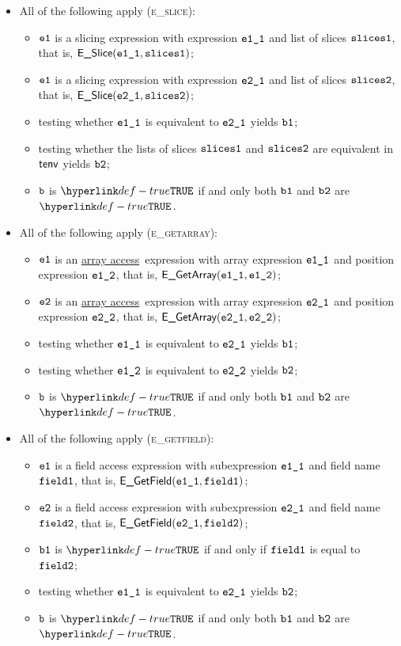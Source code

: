 \documentclass{book}
\newcommand\ProseOrTypeError[0]{\ProseTerminateAs{\TypeErrorConfig}}
\newcommand\arrayaccess[0]{\hyperlink{def-arrayaccess}{array access}}
\begin{document}
\begin{itemize}
  \item All of the following apply (\textsc{e\_slice}):
  \begin{itemize}
    \item $\texttt{e1}$ is a slicing expression with expression $\texttt{e1\_1}$ and list of slices $\texttt{slices1}$,
          that is, $\textsf{E\_Slice}(\texttt{e1\_1}, \texttt{slices1})$;
    \item $\texttt{e1}$ is a slicing expression with expression $\texttt{e2\_1}$ and list of slices $\texttt{slices2}$,
          that is, $\textsf{E\_Slice}(\texttt{e2\_1}, \texttt{slices2})$;
    \item testing whether $\texttt{e1\_1}$ is equivalent to $\texttt{e2\_1}$ yields $\texttt{b1}$\ProseOrTypeError;
    \item testing whether the lists of slices $\texttt{slices1}$ and $\texttt{slices2}$ are equivalent in $\textsf{tenv}$ yields $\texttt{b2}$\ProseOrTypeError;
    \item $\texttt{b}$ is $\True$ if and only both $\texttt{b1}$ and $\texttt{b2}$ are $\True$.
  \end{itemize}

  \item All of the following apply (\textsc{e\_getarray}):
  \begin{itemize}
    \item $\texttt{e1}$ is an \arrayaccess\ expression with array expression $\texttt{e1\_1}$ and position expression $\texttt{e1\_2}$,
          that is, $\textsf{E\_GetArray}(\texttt{e1\_1}, \texttt{e1\_2})$;
    \item $\texttt{e2}$ is an \arrayaccess\ expression with array expression $\texttt{e2\_1}$ and position expression $\texttt{e2\_2}$,
          that is, $\textsf{E\_GetArray}(\texttt{e2\_1}, \texttt{e2\_2})$;
    \item testing whether $\texttt{e1\_1}$ is equivalent to $\texttt{e2\_1}$ yields $\texttt{b1}$\ProseOrTypeError;
    \item testing whether $\texttt{e1\_2}$ is equivalent to $\texttt{e2\_2}$ yields $\texttt{b2}$\ProseOrTypeError;
    \item $\texttt{b}$ is $\True$ if and only both $\texttt{b1}$ and $\texttt{b2}$ are $\True$.
  \end{itemize}

  \item All of the following apply (\textsc{e\_getfield}):
  \begin{itemize}
    \item $\texttt{e1}$ is a field access expression with subexpression $\texttt{e1\_1}$ and field name $\texttt{field1}$,
          that is, $\textsf{E\_GetField}(\texttt{e1\_1}, \texttt{field1})$;
    \item $\texttt{e2}$ is a field access expression with subexpression $\texttt{e2\_1}$ and field name $\texttt{field2}$,
          that is, $\textsf{E\_GetField}(\texttt{e2\_1}, \texttt{field2})$;
    \item $\texttt{b1}$ is $\True$ if and only if $\texttt{field1}$ is equal to $\texttt{field2}$;
    \item testing whether $\texttt{e1\_1}$ is equivalent to $\texttt{e2\_1}$ yields $\texttt{b2}$\ProseOrTypeError;
    \item $\texttt{b}$ is $\True$ if and only both $\texttt{b1}$ and $\texttt{b2}$ are $\True$.
  \end{itemize}


\end{itemize}
\end{document}
